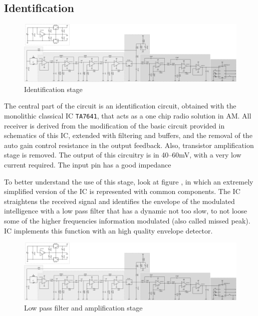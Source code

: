 \subsection{Identification}
\begin{figure}
	\centering
	\includegraphics*[viewport=1251 3 1580 595,scale=0.4]{ch2/img/receiver3.pdf}
	\caption{Identification stage}
	\label{fig:identifier}
\end{figure}
The central part of the circuit is an identification circuit, obtained with the monolithic classical IC \texttt{TA7641},  that acts as a one chip radio solution in AM. All receiver is derived from the modification of the basic circuit provided in schematics of this IC, extended with filtering and buffers, and the removal of the auto gain control resistance in the output feedback. Also, transistor amplification stage is removed. The output of this circuitry is in \numrange{40}{60}\si{\milli\volt}, with a very low current required. The input pin has a good impedance 

To better understand the use of this stage, look at figure , in which an extremely simplified version of the IC is represented with common components. The IC straightens the received signal and identifies the envelope of the modulated intelligence with a low pass filter that has a dynamic not too slow, to not loose some of the higher frequencies information modulated (also called missed peak). IC implements this function with an high quality envelope detector.
\begin{figure}
	\centering
	\includegraphics*[viewport=1443 3 2320 350,scale=0.4]{ch2/img/receiver3.pdf}
	\caption{Low pass filter and amplification stage}
	\label{fig:filter2}
\end{figure}

